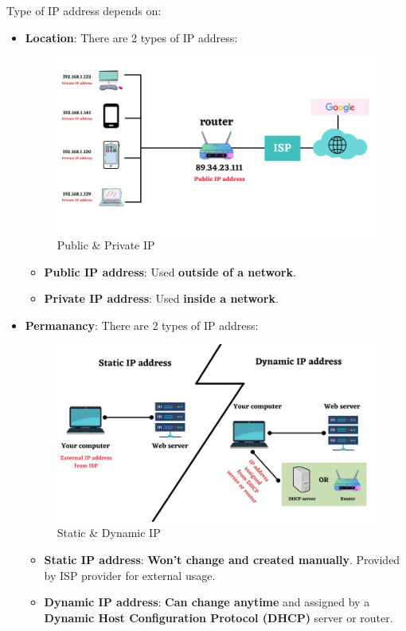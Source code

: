 \setlength{\columnsep}{3pt}
\begin{flushleft}

Type of IP address depends on:
\begin{itemize}
	\item \textbf{Location}: There are 2 types of IP address:
	\begin{figure}[h!]
		\centering
		\includegraphics[scale=0.4]{content/chapter14/images/public_private.png}
		\caption{Public \& Private IP}
		\label{fig:public_private_ip}
	\end{figure}
	
	\begin{itemize}
		\item \textbf{Public IP address}: Used \textbf{outside of a network}.
		\item \textbf{Private IP address}: Used \textbf{inside a network}.
	\end{itemize}
	\bigskip
	\bigskip
	\item \textbf{Permanancy}: There are 2 types of IP address:
	\begin{figure}[h!]
		\centering
		\includegraphics[scale=0.4]{content/chapter14/images/static_dynamic.png}
		\caption{Static \& Dynamic IP}
		\label{fig:s_d_ip}
	\end{figure}
	\begin{itemize}
		\item \textbf{Static IP address}: \textbf{Won't change and created manually}. Provided by ISP provider for external usage. 
		\item \textbf{Dynamic IP address}: \textbf{Can change anytime} and assigned by a \textbf{Dynamic Host Configuration Protocol (DHCP)} server or router.
	\end{itemize}
\end{itemize}


\end{flushleft}
